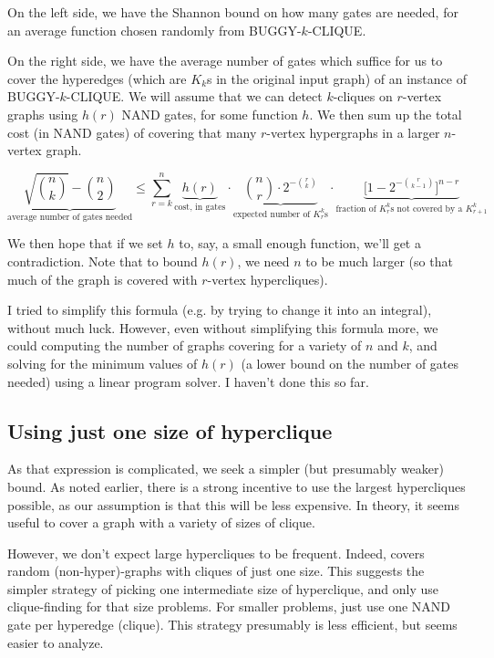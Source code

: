 \documentclass[12pt]{article}
\theoremstyle{definition}
\begin{document}
On the left side, we have
the Shannon bound on how many gates are needed, for an average function
chosen randomly from BUGGY-$k$-CLIQUE.

On the right side, we have
the average number of gates which suffice for us to cover the hyperedges
(which are $K_k$s in the original input graph) of an instance of
BUGGY-$k$-CLIQUE.
We will assume that we can detect $k$-cliques on $r$-vertex graphs using
$h(r)$ NAND gates, for some function $h$.
We then sum up the total cost (in NAND gates)
of covering that many $r$-vertex hypergraphs in a larger $n$-vertex graph.

\[
\underbrace{\sqrt{n \choose k} - {n \choose 2}}_\text{average number of gates needed}
\le \sum_{r=k}^n
\underbrace{h(r)}_\text{cost, in gates}
\cdot
\underbrace{{n \choose r} \cdot 2^{-{r \choose k}}}_\text{expected number of $K_r^k$s}
\cdot
\underbrace{\Big[1 - 2^{-{r \choose {k-1}}}\Big]^{n - r}}_\text{fraction of $K_r^k$s not covered by a $K_{r+1}^k$}
\]

We then hope that if we set $h$ to, say, a small enough
function, we'll get a contradiction. Note that to bound $h(r)$, we need
$n$ to be much larger (so that much of the graph is covered with $r$-vertex
hypercliques).

I tried to simplify this formula (e.g. by trying to change it into an
integral), without much luck.
However, even
without simplifying this formula more, we could computing
the number of graphs covering for a variety of
 $n$ and $k$, and solving for the minimum values of
$h(r)$ (a lower bound on the
number of gates needed) using a linear program solver.
I haven't done this so far.

\subsection{Using just one size of hyperclique} \label{oneCliqueSize}

As that expression is complicated, we seek a simpler (but
presumably weaker) bound.
As noted earlier, there is a strong incentive to use the largest
hypercliques possible, as our assumption is that this will be less
expensive. In theory, it seems useful to cover a graph with a variety
of sizes of clique.

However, we don't expect large hypercliques to be frequent.
Indeed, \cite{bollobas1993clique} covers random (non-hyper)-graphs
with cliques of just
one size.
This suggests the simpler strategy of picking one intermediate
size of hyperclique,
and only use clique-finding for that size problems. For smaller problems,
just use one NAND gate per hyperedge (clique).
This strategy
presumably is less efficient, but seems easier to analyze.
\end{document}
